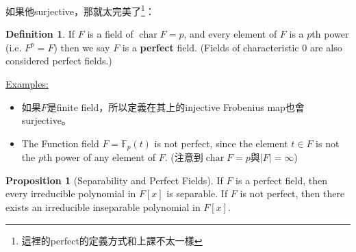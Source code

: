 \documentclass{article}
\theoremstyle{definition}
\newcommand{\ex}{\noindent\underline{Examples:}}
\newtheorem{dfn}{Definition}
\newtheorem{prop}{Proposition}
\newenvironment{proofs}[1][\proofname]{%
  \begin{proof}[#1]$ $\par\nobreak\ignorespaces
}{%
  \end{proof}
}
\newcommand{\FF}{\mathbb F}
\DeclareMathOperator{\Char}{char}
\begin{document}

如果他surjective，那就太完美了\footnote{這裡的perfect的定義方式和上課不太一樣}：
\begin{dfn}
	If $F$ is a field of $\Char F=p$, and every element of $F$ is a $p$th power (i.e. $F^p=F$) then we say $F$ is a \textbf{perfect} field. 
	(Fields of characteristic $0$ are also considered perfect fields.)
\end{dfn}

\ex 

\begin{itemize}
	\item 如果$F$是finite field，所以定義在其上的injective Frobenius map也會surjective。
	\item The Function field $F=\FF_p(t)$ is not perfect, since the element $t\in F$ is not the $p$th power of any element of $F$. (注意到$\Char F=p$與$|F|=\infty$)
\end{itemize}

\begin{prop}[Separability and Perfect Fields]
	If $F$ is a perfect field, then every irreducible polynomial in $F[x]$ is separable.
	If $F$ is not perfect, then there exists an irreducible inseparable polynomial in $F[x]$.
\end{prop}
\end{document}
